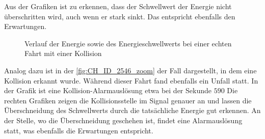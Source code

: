 Aus der Grafiken ist zu erkennen, dass der Schwellwert der Energie nicht überschritten wird, auch wenn er stark sinkt. Das entspricht ebenfalls den Erwartungen.



\begin{figure}
	\centering 
	\caption{Verlauf der Energie sowie des Energieschwellwerts bei einer echten Fahrt mit einer Kollision}
	\label{fig:CH_ID_2546_zoom}
\end{figure}
Analog dazu ist in der \autoref{fig:CH_ID_2546_zoom} der Fall dargestellt, in dem eine Kollision erkannt wurde. Während dieser Fahrt fand ebenfalls ein Unfall statt. 
In der Grafik ist eine Kollision-Alarmauslösung etwa bei der Sekunde $590$
Die rechten Grafiken zeigen die Kollisionsstelle im Signal genauer an und lassen die Überschneidung des Schwellwerts durch die tatsächliche Energie gut erkennen.
An der Stelle, wo die Überschneidung geschehen ist, findet eine Alarmauslösung statt, was ebenfalls die Erwartungen entspricht.




